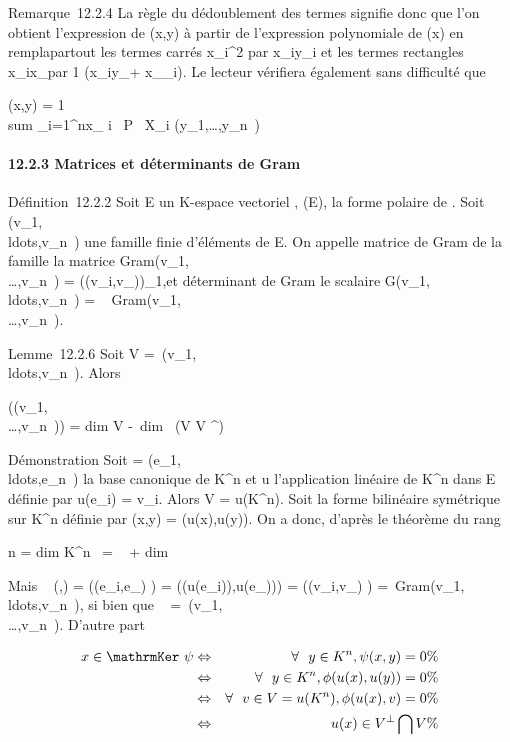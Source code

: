 \documentclass[]{article}
\begin{document}
Remarque~12.2.4 La règle du dédoublement des termes signifie donc que
l'on obtient l'expression de \phi(x,y) à partir de l'expression polynomiale
de \Phi(x) en rempla\ccant partout les termes carrés
x\_i^2 par x\_iy\_i et les termes
rectangles x\_ix\_\jmath par  1 
(x\_iy\_\jmath + x\_\jmathy\_i). Le lecteur
vérifiera également sans difficulté que

\phi(x,y) = 1  \\sum
\_i=1^nx\_ i \partial~P \over
\partial~X\_i
(y\_1,\ldots,y\_n~)

\paragraph{12.2.3 Matrices et déterminants de Gram}

Définition~12.2.2 Soit E un K-espace vectoriel , \Phi \inQ(E), \phi la forme
polaire de \Phi. Soit
(v\_1,\\ldots,v\_n~)
une famille finie d'éléments de E. On appelle matrice de Gram de la
famille la matrice
Gram(v\_1,\\\ldots,v\_n~)
= (\phi(v\_i,v\_\jmath))\_1\leqi,\jmath\leqn et déterminant de Gram
le scalaire
G(v\_1,\\ldots,v\_n~)
= ~
Gram(v\_1,\\\ldots,v\_n~).

Lemme~12.2.6 Soit V =\
\mathrmVect(v\_1,\\ldots,v\_n~).
Alors

\mathrmrg(\Gram(v\_1,\\\ldots,v\_n~))
= dim V -\ dim~ (V \bigcap
V ^\bot)

Démonstration Soit  =
(e\_1,\\ldots,e\_n~)
la base canonique de K^n et u l'application linéaire de
K^n dans E définie par u(e\_i) = v\_i. Alors
V = u(K^n). Soit \psi la forme bilinéaire symétrique sur
K^n définie par \psi(x,y) = \phi(u(x),u(y)). On a donc, d'après le
théorème du rang

n = dim K^n~
= \mathrmrg~\psi
+ dim~
\mathrmKer~\psi

Mais \mathrmMat~ (\psi,) =
\left (\psi(e\_i,e\_\jmath)\right
) = \left
(\phi(u(e\_i)),u(e\_\jmath))\right ) =
\left (\phi(v\_i,v\_\jmath)\right
) =\
Gram(v\_1,\\ldots,v\_n~),
si bien que \mathrmrg~\psi
=\
\mathrmrgGram(v\_1,\\\ldots,v\_n~).
D'autre part

\begin{align*} x
\in\mathrmKer~\psi&
\Leftrightarrow & \forall~~y \in
K^n, \psi(x,y) = 0 \%& \\ &
\Leftrightarrow & \forall~~y \in
K^n,\phi(u(x),u(y)) = 0 \%& \\ &
\Leftrightarrow & \forall~~v \in V =
u(K^n), \phi(u(x),v) = 0\%& \\ &
\Leftrightarrow & u(x) \in V ^\bot\bigcap V \%&
\\ \end{align*}
\end{document}

